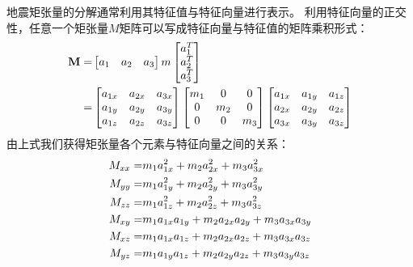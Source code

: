地震矩张量的分解通常利用其特征值与特征向量进行表示。
利用特征向量的正交性，任意一个矩张量$M$矩阵可以写成特征向量与特征值的矩阵乘积形式：
\begin{align}
    \mathbf{M}
    = &
    \begin{bmatrix}
        a_1 & a_2 & a_3
    \end{bmatrix}
    m
    \begin{bmatrix}
        a_1^T \\
        a_2^T \\
        a_3^T \\
    \end{bmatrix} \notag \\
    = & 
    \begin{bmatrix}
        a_{1x} & a_{2x} & a_{3x} \\
        a_{1y} & a_{2y} & a_{3y} \\
        a_{1z} & a_{2z} & a_{3z} \\
    \end{bmatrix}
    \begin{bmatrix}
        m_{1} & 0 & 0 \\
        0 & m_{2} & 0 \\
        0 & 0 & m_{3} \\
    \end{bmatrix}
    \begin{bmatrix}
        a_{1x} & a_{1y} & a_{1z} \\
        a_{2x} & a_{2y} & a_{2z} \\
        a_{3x} & a_{3y} & a_{3z} \\
    \end{bmatrix}
    \label{equ:m-a-aT}
\end{align}
由上式我们获得矩张量各个元素与特征向量之间的关系：
\begin{align}
    M_{xx} =& m_1 a_{1x}^2 + m_2 a_{2x}^2 + m_3 a_{3x}^2 \notag \\
    M_{yy} =& m_1 a_{1y}^2 + m_2 a_{2y}^2 + m_3 a_{3y}^2 \notag \\
    M_{zz} =& m_1 a_{1z}^2 + m_2 a_{2z}^2 + m_3 a_{3z}^2 \notag \\
    M_{xy} =& m_1 a_{1x}a_{1y} + m_2 a_{2x}a_{2y} + m_3 a_{3x}a_{3y} \notag \\
    M_{xz} =& m_1 a_{1x}a_{1z} + m_2 a_{2x}a_{2z} + m_3 a_{3x}a_{3z} \notag \\
    M_{yz} =& m_1 a_{1y}a_{1z} + m_2 a_{2y}a_{2z} + m_3 a_{3y}a_{3z}  
    \label{equ:m-comp}
\end{align}
